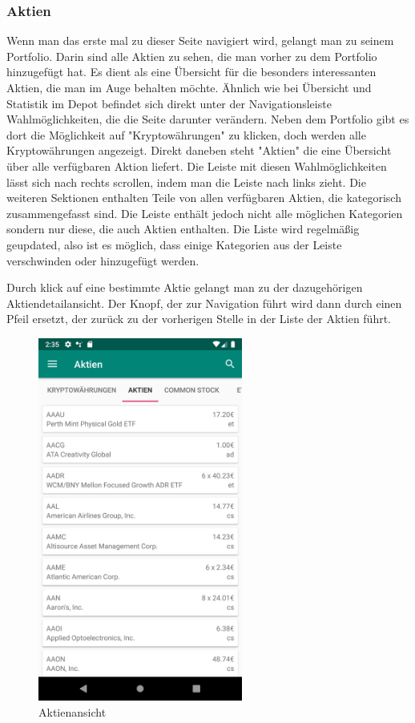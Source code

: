 \documentclass[10pt]{scrartcl}
\begin{document}
\subsubsection{Aktien}
Wenn man das erste mal zu dieser Seite navigiert wird, gelangt man zu seinem Portfolio. Darin sind alle Aktien zu sehen, die man vorher zu dem Portfolio hinzugefügt hat. Es dient als eine Übersicht für die besonders interessanten Aktien, die man im Auge behalten möchte. Ähnlich wie bei Übersicht und Statistik im Depot befindet sich direkt unter der Navigationsleiste Wahlmöglichkeiten, die die Seite darunter verändern. Neben dem Portfolio gibt es dort die Möglichkeit auf "Kryptowährungen" zu klicken, doch werden alle Kryptowährungen angezeigt. Direkt daneben steht "Aktien" die eine Übersicht über alle verfügbaren Aktion liefert. Die Leiste mit diesen Wahlmöglichkeiten lässt sich nach rechts scrollen, indem man die Leiste nach links zieht. Die weiteren Sektionen enthalten Teile von allen verfügbaren Aktien, die kategorisch zusammengefasst sind. Die Leiste enthält jedoch nicht alle möglichen Kategorien sondern nur diese, die auch Aktien enthalten. Die Liste wird regelmäßig geupdated, also ist es möglich, dass einige Kategorien aus der Leiste verschwinden oder hinzugefügt werden.

Durch klick auf eine bestimmte Aktie gelangt man zu der dazugehörigen Aktiendetailansicht. Der Knopf, der zur Navigation führt wird dann durch einen Pfeil ersetzt, der zurück zu der vorherigen Stelle in der Liste der Aktien führt.

\begin{figure}[H]
	\centering
	\includegraphics[width=0.6\textwidth]{Bilder/Applikation/Aktien.png}
	\caption{Aktienansicht}
\end{figure}
\end{document}

